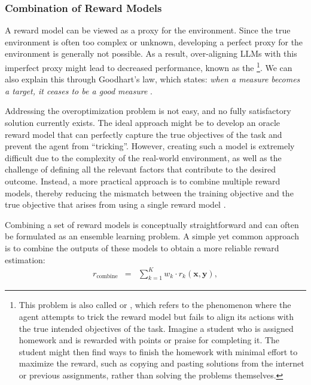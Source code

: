 \subsubsection{Combination of Reward Models}

\noindent A reward model can be viewed as a proxy for the environment. Since the true environment is often too complex or unknown, developing a perfect proxy for the environment is generally not possible. As a result, over-aligning LLMs with this imperfect proxy might lead to decreased performance, known as the  \cite{stiennon-etal:2020learning,gao-etal:2023scaling}\footnote{This problem is also called  or  \cite{krakovna-etal:2020specification,skalse-etal:2022defining,pan-etal:2022theeffects}, which refers to the phenomenon where the agent attempts to trick the reward model but fails to align its actions with the true intended objectives of the task. Imagine a student who is assigned homework and is rewarded with points or praise for completing it. The student might then find ways to finish the homework with minimal effort to maximize the reward, such as copying and pasting solutions from the internet or previous assignments, rather than solving the problems themselves.}. We can also explain this through Goodhart's law, which states: \textit{when a measure becomes a target, it ceases to be a good measure} \cite{goodhart:1984problems}.

Addressing the overoptimization problem is not easy, and no fully satisfactory solution currently exists. The ideal approach might be to develop an oracle reward model that can perfectly capture the true objectives of the task and prevent the agent from ``tricking''. However, creating such a model is extremely difficult due to the complexity of the real-world environment, as well as the challenge of defining all the relevant factors that contribute to the desired outcome. Instead, a more practical approach is to combine multiple reward models, thereby reducing the mismatch between the training objective and the true objective that arises from using a single reward model \cite{coste-etal:2024reward}.

Combining a set of reward models is conceptually straightforward and can often be formulated as an ensemble learning problem. A simple yet common approach is to combine the outputs of these models to obtain a more reliable reward estimation:
\begin{eqnarray}
r_{\mathrm{combine}} & = & \sum_{k=1}^{K} w_k \cdot r_k(\mathbf{x},\mathbf{y}),
\end{eqnarray}

